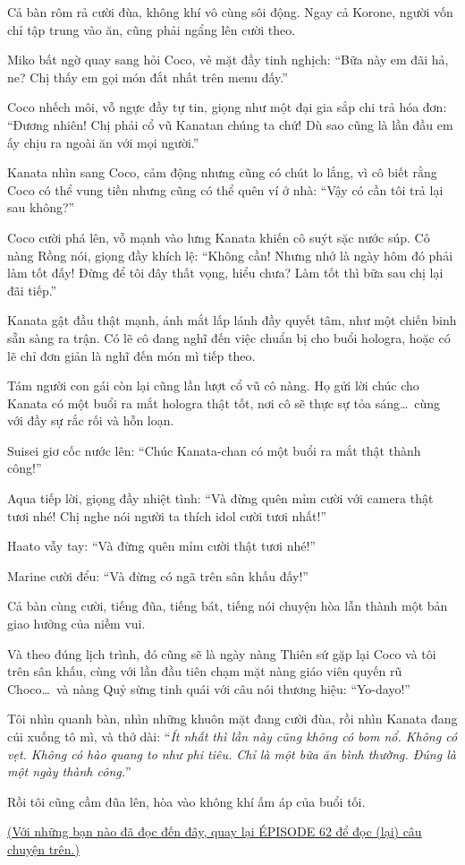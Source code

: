 \documentclass[../main.tex]{subfiles}
\begin{document}
Cả bàn rôm rả cười đùa, không khí vô cùng sôi động. Ngay cả Korone, người vốn chỉ tập trung vào ăn, cũng phải ngẩng lên cười theo.

Miko bất ngờ quay sang hỏi Coco, vẻ mặt đầy tinh nghịch: ``Bữa này em đãi hả, ne? Chị thấy em gọi món đắt nhất trên menu đấy.''

Coco nhếch môi, vỗ ngực đầy tự tin, giọng như một đại gia sắp chi trả hóa đơn: ``Đương nhiên! Chị phải cổ vũ Kanatan chúng ta chứ! Dù sao cũng là lần đầu em ấy chịu ra ngoài ăn với mọi người.''

Kanata nhìn sang Coco, cảm động nhưng cũng có chút lo lắng, vì cô biết rằng Coco có thể vung tiền nhưng cũng có thể quên ví ở nhà: ``Vậy có cần tôi trả lại sau không?''

Coco cười phá lên, vỗ mạnh vào lưng Kanata khiến cô suýt sặc nước súp. Cô nàng Rồng nói, giọng đầy khích lệ: ``Không cần! Nhưng nhớ là ngày hôm đó phải làm tốt đấy! Đừng để tôi đây thất vọng, hiểu chưa? Làm tốt thì bữa sau chị lại đãi tiếp.''

Kanata gật đầu thật mạnh, ánh mắt lấp lánh đầy quyết tâm, như một chiến binh sẵn sàng ra trận. Có lẽ cô đang nghĩ đến việc chuẩn bị cho buổi hologra, hoặc có lẽ chỉ đơn giản là nghĩ đến món mì tiếp theo.

Tám người con gái còn lại cũng lần lượt cổ vũ cô nàng. Họ gửi lời chúc cho Kanata có một buổi ra mắt hologra thật tốt, nơi cô sẽ thực sự tỏa sáng\dots\ cùng với đầy sự rắc rối và hỗn loạn.

Suisei giơ cốc nước lên: ``Chúc Kanata-chan có một buổi ra mắt thật thành công!''

Aqua tiếp lời, giọng đầy nhiệt tình: ``Và đừng quên mỉm cười với camera thật tươi nhé! Chị nghe nói người ta thích idol cười tươi nhất!''

Haato vẫy tay: ``Và đừng quên mỉm cười thật tươi nhé!''

Marine cười đểu: ``Và đừng có ngã trên sân khấu đấy!''

Cả bàn cùng cười, tiếng đũa, tiếng bát, tiếng nói chuyện hòa lẫn thành một bản giao hưởng của niềm vui.

Và theo đúng lịch trình, đó cũng sẽ là ngày nàng Thiên sứ gặp lại Coco và tôi trên sân khấu, cùng với lần đầu tiên chạm mặt nàng giáo viên quyến rũ Choco\dots\ và nàng Quỷ sừng tinh quái với câu nói thương hiệu: ``Yo-dayo!''

Tôi nhìn quanh bàn, nhìn những khuôn mặt đang cười đùa, rồi nhìn Kanata đang cúi xuống tô mì, và thở dài: ``\textit{Ít nhất thì lần này cũng không có bom nổ. Không có vẹt. Không có hào quang to như phi tiêu. Chỉ là một bữa ăn bình thường. Đúng là một ngày thành công.}''

Rồi tôi cũng cầm đũa lên, hòa vào không khí ấm áp của buổi tối.

\begin{center}
  \uline{(Với những bạn nào đã đọc đến đây, quay lại {\flaregothic ÉPISODE 62} để đọc (lại) câu chuyện trên.)}
\end{center}
\end{document}
